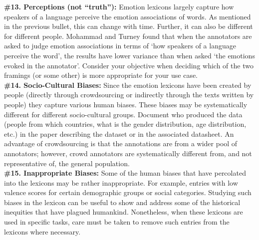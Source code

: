 \documentclass[11pt]{article}
\begin{document}
\noindent \textbf{\#13. Perceptions (not ``truth''):}
Emotion lexicons largely capture how speakers of a language perceive the emotion associations of words. 
As mentioned in the previous bullet, this can change with time. Further, it can also be different for different people. Mohammad and Turney  found that when the annotators are asked to judge emotion associations in terms of `how speakers of a language perceive the word', the results have lower variance than when asked `the emotions evoked in the annotator'. Consider your objective when deciding which of the two framings (or some other) is more appropriate for your use case. \\[-10pt]



\noindent \textbf{\#14. Socio-Cultural Biases:}
Since the emotion lexicons have been created by people (directly through crowdsourcing or indirectly through the texts written by people) they capture various human biases.
These biases may be systematically different for different socio-cultural groups. Document who produced the data (people from which countries, what is the gender distribution, age distribution, etc.) in the paper describing the dataset or in the associated datasheet. An advantage of crowdsourcing is that the annotations are from a wider pool of annotators; however, crowd annotators are systematically different from, and not representative of, the general population.\\[-10pt] %


\noindent \textbf{\#15. Inappropriate Biases:} Some of the human biases that have percolated into the lexicons may be rather inappropriate. For example, entries with low valence scores for certain demographic groups or social categories. 
Studying such biases in the lexicon can be useful to show and address some of the historical inequities that have plagued humankind. Nonetheless, when these lexicons are used in specific tasks, care must be taken to 
remove such entries from the lexicons where necessary.\\[-10pt]
\end{document}
